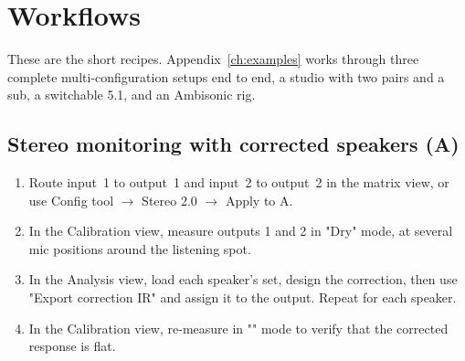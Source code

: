\chapter{Workflows}\label{ch:workflows}

These are the short recipes. Appendix~\ref{ch:examples} works through three complete multi-configuration setups end to end, a studio with two pairs and a sub, a switchable 5.1, and an Ambisonic rig.

\section{Stereo monitoring with corrected speakers (A)}
\begin{enumerate}[nosep]
  \item Route input~1 to output~1 and input~2 to output~2 in the matrix view, or use Config tool $\rightarrow$ Stereo 2.0 $\rightarrow$ Apply to A.
  \item In the Calibration view, measure outputs 1 and 2 in "Dry" mode, at several mic positions around the listening spot.
  \item In the Analysis view, load each speaker's set, design the correction, then use "Export correction IR" and assign it to the output. Repeat for each speaker.
  \item In the Calibration view, re-measure in "" mode to verify that the corrected response is flat.
\end{enumerate}

